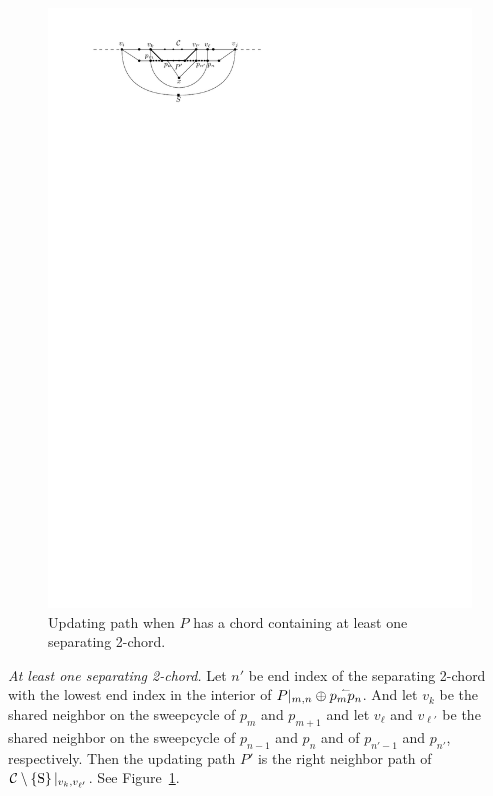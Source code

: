 \begin{figure}[!b]
        \includegraphics[scale=1]{unifiedAlgo/img/sweep/cases/2chordInChordUpdate}
        \caption{Updating path when $P$ has a chord containing at least one separating 2-chord.}
        \label{fig:sweep:2chordInChordUpdate}
      \end{figure}

    \emph{At least one separating 2-chord.}
      Let $n'$ be end index of the separating 2-chord with the lowest end index in the interior of $P|_{m, n} \oplus \accentset{\leftharpoonup}{p_m p_n}$. And let $v_k$ be the shared neighbor on the sweepcycle of $p_{m}$ and $p_{m +1}$ and let $v_\ell$ and $v_{\ell'}$ be the shared neighbor on the sweepcycle  of $p_{n -1}$ and $p_{n}$ and of $p_{n' -1}$ and $p_{n'}$, respectively.
      Then the updating path $P'$ is the right neighbor path of $\mathcal{C} \setminus \left\lbrace {\mathrm{S}} \right\rbrace|_{v_k, v_{\ell'}}$. See Figure~\ref{fig:sweep:2chordInChordUpdate}.

